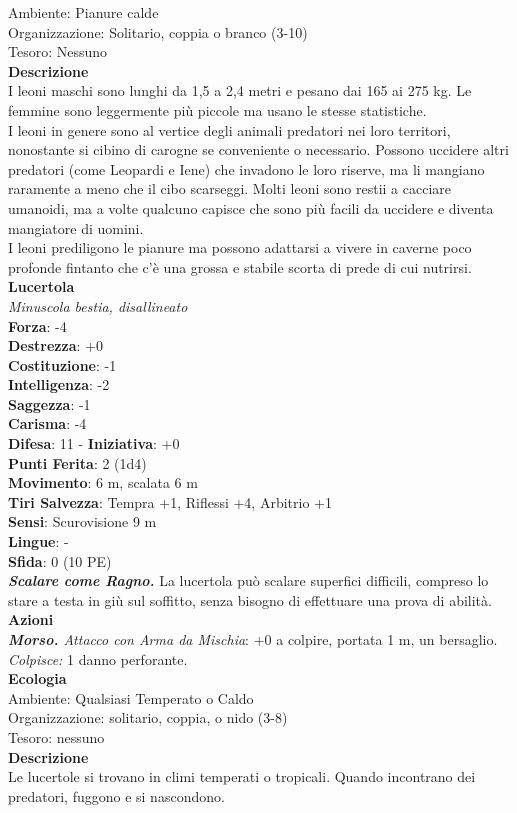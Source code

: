\begin{multicols}{2}
Ambiente: Pianure calde\\
Organizzazione: Solitario, coppia o branco (3-10)\\
Tesoro: Nessuno\\
\textbf{Descrizione}\\
I leoni maschi sono lunghi da 1,5 a 2,4 metri e pesano dai 165 ai 275 kg. Le femmine sono leggermente più piccole ma usano le stesse statistiche.\\
I leoni in genere sono al vertice degli animali predatori nei loro territori, nonostante si cibino di carogne se conveniente o necessario. Possono uccidere altri predatori (come Leopardi e Iene) che invadono le loro riserve, ma li mangiano raramente a meno che il cibo scarseggi. Molti leoni sono restii a cacciare umanoidi, ma a volte qualcuno capisce che sono più facili da uccidere e diventa mangiatore di uomini.\\
I leoni prediligono le pianure ma possono adattarsi a vivere in caverne poco profonde fintanto che c’è una grossa e stabile scorta di prede di cui nutrirsi. \\

\medskip\textbf{Lucertola}\\
\emph{Minuscola bestia, disallineato}\\
\textbf{Forza}: -4\\
\textbf{Destrezza}: +0\\
\textbf{Costituzione}: -1\\
\textbf{Intelligenza}: -2\\
\textbf{Saggezza}: -1\\
\textbf{Carisma}: -4\\
\textbf{Difesa}: 11 - \textbf{Iniziativa}: +0\\
\textbf{Punti Ferita}: 2 (1d4)\\
\textbf{Movimento}: 6 m, scalata 6 m\\
\textbf{Tiri Salvezza}:  Tempra +1, Riflessi +4, Arbitrio +1 \\
\textbf{Sensi}: Scurovisione 9 m\\
\textbf{Lingue}: -\\
\textbf{Sfida}: 0 (10 PE)\smallskip\\
\emph{\textbf{Scalare come Ragno.}} La lucertola può scalare superfici difficili, compreso lo stare a testa in giù sul soffitto, senza bisogno di effettuare una prova di abilità.\\
\smallskip\textbf{Azioni}\\
\emph{\textbf{Morso.} Attacco con Arma da Mischia}: +0 a colpire, portata 1 m, un bersaglio.\\
\emph{Colpisce:} 1 danno perforante.\\
\textbf{Ecologia}\\
Ambiente: Qualsiasi Temperato o Caldo\\
Organizzazione: solitario, coppia, o nido (3-8)\\
Tesoro: nessuno\\
\textbf{Descrizione}\\
Le lucertole si trovano in climi temperati o tropicali. Quando incontrano dei predatori, fuggono e si nascondono. \\


\end{multicols}
